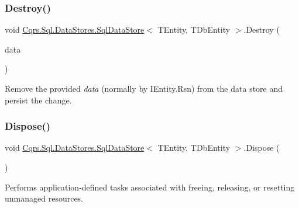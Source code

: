 \subsubsection{\texorpdfstring{Destroy()}{Destroy()}}
{\footnotesize\ttfamily void \hyperlink{classCqrs_1_1Sql_1_1DataStores_1_1SqlDataStore}{Cqrs.\+Sql.\+Data\+Stores.\+Sql\+Data\+Store}$<$ T\+Entity, T\+Db\+Entity $>$.Destroy (\begin{DoxyParamCaption}\item[{T\+Entity}]{data }\end{DoxyParamCaption})}



Remove the provided {\itshape data}  (normally by I\+Entity.\+Rsn) from the data store and persist the change. 

\mbox{\label{classCqrs_1_1Sql_1_1DataStores_1_1SqlDataStore_ac142d009f768519891ca12185a2e6191_ac142d009f768519891ca12185a2e6191}} 
\subsubsection{\texorpdfstring{Dispose()}{Dispose()}}
{\footnotesize\ttfamily void \hyperlink{classCqrs_1_1Sql_1_1DataStores_1_1SqlDataStore}{Cqrs.\+Sql.\+Data\+Stores.\+Sql\+Data\+Store}$<$ T\+Entity, T\+Db\+Entity $>$.Dispose (\begin{DoxyParamCaption}{ }\end{DoxyParamCaption})}



Performs application-\/defined tasks associated with freeing, releasing, or resetting unmanaged resources. 

\mbox{\label{classCqrs_1_1Sql_1_1DataStores_1_1SqlDataStore_a2114238ed13dfe1beaf1b096d3e36c6a_a2114238ed13dfe1beaf1b096d3e36c6a}} 

